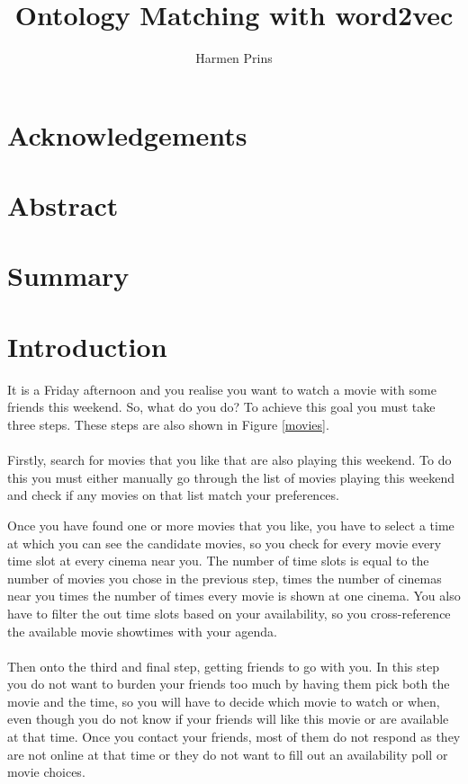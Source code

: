 \documentclass{article}
\title{Ontology Matching with word2vec}
\author{Harmen Prins}
\begin{document}
 \maketitle
 \newpage
 
 \section*{Acknowledgements}
 \section*{Abstract}  
 
 \section*{Summary}
 \tableofcontents
 \newpage
 
 \section{Introduction} \label{intro}
 It is a Friday afternoon and you realise you want to watch a movie with some friends this weekend. So, what do you do? To achieve this goal you must take three steps. These steps are also shown in Figure \ref{movies}.
 \paragraph{}
 Firstly, search for movies that you like that are also playing this weekend. To do this you must either manually go through the list of movies playing this weekend and check if any movies on that list match your preferences.
 
 Once you have found one or more movies that you like, you have to select a time at which you can see the candidate movies, so you check for every movie every time slot at every cinema near you. The number of time slots is equal to the number of movies you chose in the previous step, times the number of cinemas near you times the number of times every movie is shown at one cinema. You also have to filter the out time slots based on your availability, so you cross-reference the available movie showtimes with your agenda.
 \paragraph{}
 Then onto the third and final step, getting friends to go with you. In this step you do not want to burden your friends too much by having them pick both the movie and the time, so you will have to decide which movie to watch or when, even though you do not know if your friends will like this movie or are available at that time. Once you contact your friends, most of them do not respond as they are not online at that time or they do not want to fill out an availability poll or movie choices.
\end{document}
